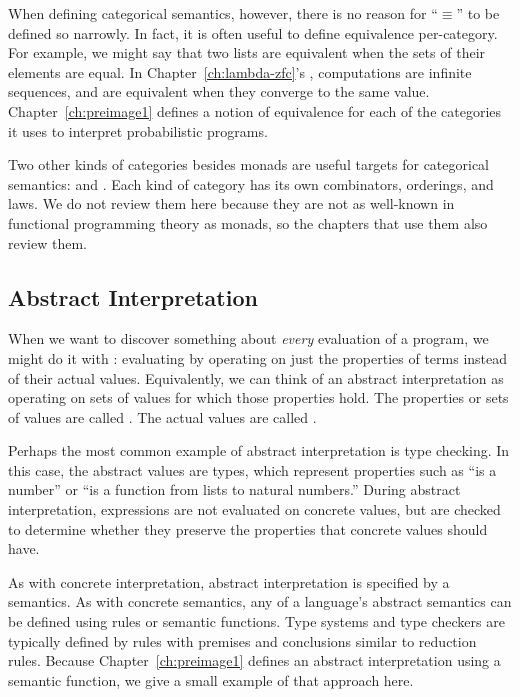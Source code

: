 When defining categorical semantics, however, there is no reason for ``$\equiv$'' to be defined so narrowly.
In fact, it is often useful to define equivalence per-category.
For example, we might say that two lists are equivalent when the sets of their elements are equal.
In Chapter~\ref{ch:lambda-zfc}'s , computations are infinite sequences, and are equivalent when they converge to the same value.
Chapter~\ref{ch:preimage1} defines a notion of equivalence for each of the categories it uses to interpret probabilistic programs.

Two other kinds of categories besides monads are useful targets for categorical semantics:  and .
Each kind of category has its own combinators, orderings, and laws.
We do not review them here because they are not as well-known in functional programming theory as monads, so the chapters that use them also review them.


\subsection{Abstract Interpretation}

When we want to discover something about \emph{every} evaluation of a program, we might do it with : evaluating by operating on just the properties of terms instead of their actual values. Equivalently, we can think of an abstract interpretation as operating on sets of values for which those properties hold.
The properties or sets of values are called .
The actual values are called .

Perhaps the most common example of abstract interpretation is type checking.
In this case, the abstract values are types, which represent properties such as ``is a number'' or ``is a function from lists to natural numbers.''
During abstract interpretation, expressions are not evaluated on concrete values, but are checked to determine whether they preserve the properties that concrete values should have.

As with concrete interpretation, abstract interpretation is specified by a semantics.
As with concrete semantics, any of a language's abstract semantics can be defined using rules or semantic functions.
Type systems and type checkers are typically defined by rules with premises and conclusions similar to reduction rules.
Because Chapter~\ref{ch:preimage1} defines an abstract interpretation using a semantic function, we give a small example of that approach here.

